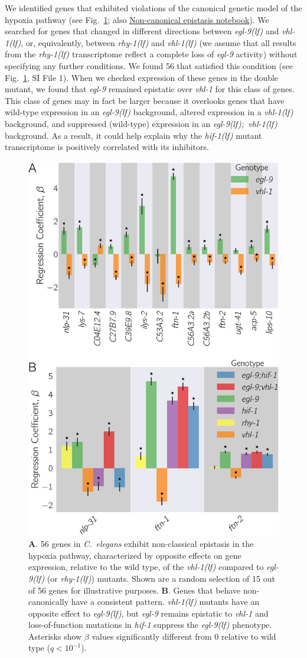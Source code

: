 \documentclass[9pt,twocolumn,twoside]{pnas-new}
\newcommand{\qval}[1]{$q<10^{-#1}$}
\newcommand{\cel}{\emph{C.~elegans}}
\newcommand{\gene}[1]{\mbox{\emph{#1}}}
\newcommand{\egl}{\gene{egl-9(lf)}}
\newcommand{\rhy}{\gene{rhy-1(lf)}}
\newcommand{\vhl}{\gene{vhl-1(lf)}}
\newcommand{\eglvhl}{\gene{egl-9(lf); vhl-1(lf)}}
\newcommand{\hif}{\gene{hif-1(lf)}}
\newcommand{\hifohtargets}{56}
\begin{document}
We identified genes that exhibited violations of the canonical genetic
model of the hypoxia pathway (see Fig.~\ref{fig:hif1oh}; also
\href{https://wormlabcaltech.github.io/mprsq/analysis_notebooks/7_hifoh.html}
{Non-canonical epistasis notebook}). We searched for genes that changed in different
directions between \egl{} and \vhl{}, or, equivalently, between \rhy{} and
\vhl{} (we assume that all results from the \rhy{} transcriptome reflect a
complete loss of \gene{egl-9} activity) without specifying any further
conditions. We found \hifohtargets{} that satisfied this condition (see
Fig.~\ref{fig:hif1oh}, SI File 1). When we checked expression of
these genes in the double mutant, we found that \gene{egl-9} remained epistatic
over \gene{vhl-1} for this class of genes. This class of genes may in fact be
larger because it overlooks genes that have wild-type expression in an
\egl{} background, altered expression in a \vhl{} background, and suppressed
(wild-type) expression  in an \eglvhl{} background.
As a result, it could help
explain why the \hif{} mutant transcriptome is positively correlated with its
inhibitors.
\color{black}

\begin{figure}[tbhp]
  \centering
  \includegraphics[width=.4\textwidth]{../final_figs/hif1oh_epistasis.pdf}
  \caption{
    \textbf{A}. \hifohtargets{} genes in \cel{} exhibit non-classical epistasis
    in the hypoxia pathway, characterized by opposite effects on gene expression,
    relative to the wild type, of the \vhl{} compared to \egl{} (or \rhy{})
    mutants. Shown are a random selection of 15 out of \hifohtargets{} genes for
    illustrative purposes. \textbf{B}. Genes that behave non-canonically  have a
    consistent pattern. \vhl{} mutants have an opposite effect to \egl{}, but
    \gene{egl-9} remains epistatic to \gene{vhl-1} and loss-of-function
    mutations in \gene{hif-1} suppress the \egl{} phenotype. Asterisks show
    $\beta$ values significantly different from 0 relative to wild type
    (\qval{1}).
  }
\label{fig:hif1oh}
\end{figure}
\end{document}
